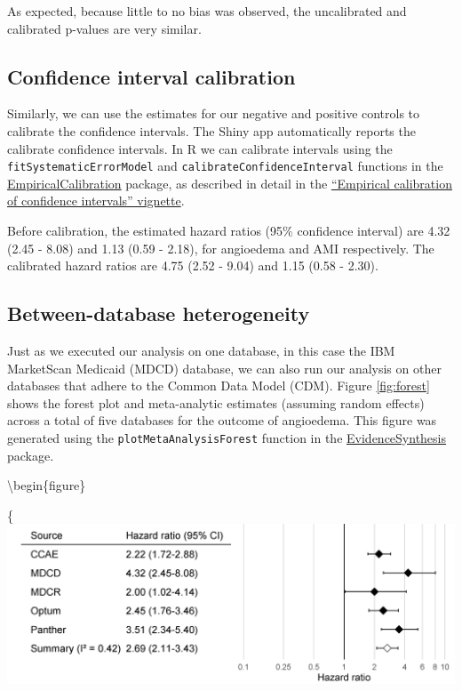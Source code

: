 \documentclass[11pt]{book}
\begin{document}
As expected, because little to no bias was observed, the uncalibrated
and calibrated p-values are very similar.

\subsection{Confidence interval
calibration}\label{confidence-interval-calibration-1}

Similarly, we can use the estimates for our negative and positive
controls to calibrate the confidence intervals. The Shiny app
automatically reports the calibrate confidence intervals. In R we can
calibrate intervals using the \texttt{fitSystematicErrorModel} and
\texttt{calibrateConfidenceInterval} functions in the
\href{https://ohdsi.github.io/EmpiricalCalibration/}{EmpiricalCalibration}
package, as described in detail in the
\href{https://ohdsi.github.io/EmpiricalCalibration/articles/EmpiricalCiCalibrationVignette.html}{``Empirical
calibration of confidence intervals'' vignette}.

Before calibration, the estimated hazard ratios (95\% confidence
interval) are 4.32 (2.45 - 8.08) and 1.13 (0.59 - 2.18), for angioedema
and AMI respectively. The calibrated hazard ratios are 4.75 (2.52 -
9.04) and 1.15 (0.58 - 2.30).

\subsection{Between-database
heterogeneity}\label{between-database-heterogeneity}

Just as we executed our analysis on one database, in this case the IBM
MarketScan Medicaid (MDCD) database, we can also run our analysis on
other databases that adhere to the Common Data Model (CDM). Figure
\ref{fig:forest} shows the forest plot and meta-analytic estimates
(assuming random effects) \citep{dersimonian_1986} across a total of
five databases for the outcome of angioedema. This figure was generated
using the \texttt{plotMetaAnalysisForest} function in the
\href{https://ohdsi.github.io/EvidenceSynthesis/}{EvidenceSynthesis}
package.

\textbackslash{}begin\{figure\}

\{\centering \includegraphics[width=0.9\linewidth]{images/MethodValidity/forest}
\end{document}

